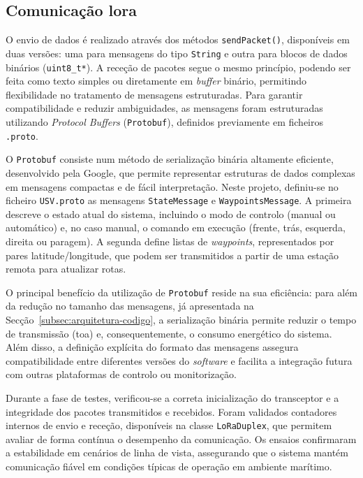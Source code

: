 \subsection{Comunicação \acrfull{lora}}
\label{subsec:comunicacao-lora}

O envio de dados é realizado através dos métodos \texttt{sendPacket()}, disponíveis em duas versões: uma para mensagens do tipo \texttt{String} e outra para blocos de dados binários (\texttt{uint8\_t*}). A receção de pacotes segue o mesmo princípio, podendo ser feita como texto simples ou diretamente em \emph{buffer} binário, permitindo flexibilidade no tratamento de mensagens estruturadas. Para garantir compatibilidade e reduzir ambiguidades, as mensagens foram estruturadas utilizando \emph{Protocol Buffers} (\texttt{Protobuf}), definidos previamente em ficheiros \texttt{.proto}.  

O \texttt{Protobuf} \cite{google-protobuf} consiste num método de serialização binária altamente eficiente, desenvolvido pela Google, que permite representar estruturas de dados complexas em mensagens compactas e de fácil interpretação. Neste projeto, definiu-se no ficheiro \texttt{USV.proto} as mensagens \texttt{StateMessage} e \texttt{WaypointsMessage}. A primeira descreve o estado atual do sistema, incluindo o modo de controlo (manual ou automático) e, no caso manual, o comando em execução (frente, trás, esquerda, direita ou paragem). A segunda define listas de \emph{waypoints}, representados por pares latitude/longitude, que podem ser transmitidos a partir de uma estação remota para atualizar rotas.  

O principal benefício da utilização de \texttt{Protobuf} reside na sua eficiência: para além da redução no tamanho das mensagens, já apresentada na Secção~\ref{subsec:arquitetura-codigo}, a serialização binária permite reduzir o tempo de transmissão (\gls{toa}) e, consequentemente, o consumo energético do sistema. Além disso, a definição explícita do formato das mensagens assegura compatibilidade entre diferentes versões do \emph{software} e facilita a integração futura com outras plataformas de controlo ou monitorização.  

Durante a fase de testes, verificou-se a correta inicialização do transceptor e a integridade dos pacotes transmitidos e recebidos. Foram validados contadores internos de envio e receção, disponíveis na classe \texttt{LoRaDuplex}, que permitem avaliar de forma contínua o desempenho da comunicação. Os ensaios confirmaram a estabilidade em cenários de linha de vista, assegurando que o sistema mantém comunicação fiável em condições típicas de operação em ambiente marítimo.  

